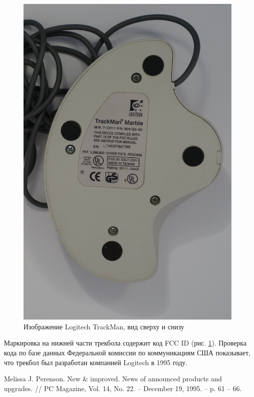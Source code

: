 \documentclass[11pt, a4paper]{article}
\begin{document}
\begin{figure}[h]
    \includegraphics[scale=1]{1995_logitech_trackman/2.17.JPG}
    \caption{Изображение Logitech TrackMan, вид сверху и снизу}
    \label{fig:trackmanTopAndBottom}
\end{figure}
    
    Маркировка на нижней части трекбола содержит код FCC ID (рис. \ref{fig:trackmanTopAndBottom}).
    Проверка кода по базе данных Федеральной комиссии по коммуникациям США показывает, что трекбол был разработан компанией Logitech в 1995 году.


\begin{thebibliography}{9}
 Melissa J. Perenson. New \& improved. News of announced products and upgrades. // PC Magazine, Vol. 14, No. 22. -- December 19, 1995. -- p. 61 -- 66.
\end{thebibliography}
\end{document}
